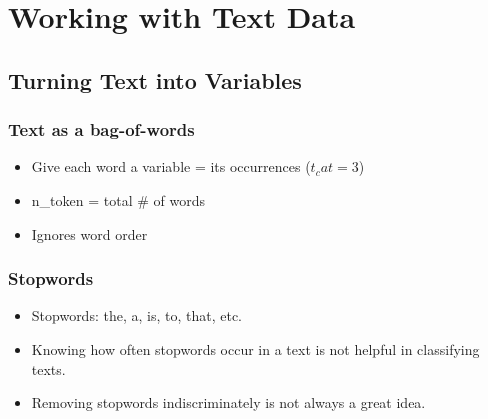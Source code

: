 \documentclass[12pt, oneside]{article}
\begin{document}
\newpage
\section{Working with Text Data}
\subsection{Turning Text into Variables}
\subsubsection{Text as a bag-of-words}
\begin{itemize}
    \item Give each word a variable = its occurrences ($t_cat = 3$)
    \item n\_token = total \# of words
    \item Ignores word order
\end{itemize}

\subsubsection{Stopwords}
\begin{itemize}
    \item Stopwords: the, a, is, to, that, etc.
    \item Knowing how often stopwords occur in a text is not helpful in classifying texts.
    \item Removing stopwords indiscriminately is not always a great idea.
\end{itemize}
\end{document}
